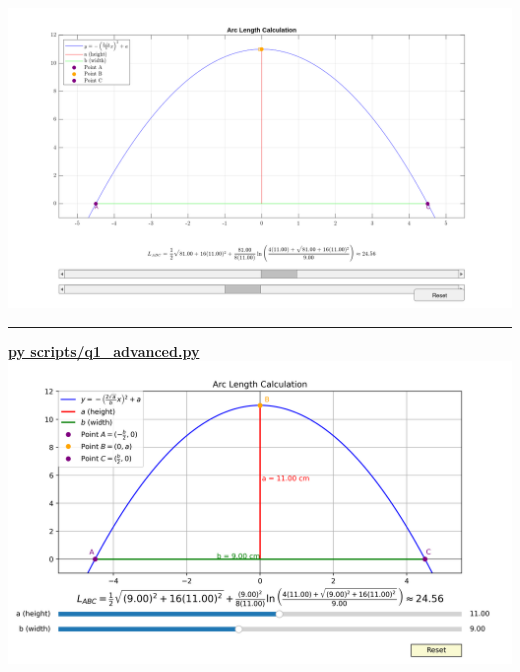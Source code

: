 \documentclass[a4paper, 12pt]{report}
\def\link{blue!50!black}
\begin{document}
    
    \includegraphics[width=1\textwidth]{images/rmatFigure_1.png}\\
    \vspace{2em}    
    \hrule
    \vspace{3em}
    \href{https://github.com/sakx7/mathcompuni/blob/main/py scripts/q1_advanced.py}{\textcolor{\link}{\textbf{py scripts/q1\_advanced.py}}}
    \includegraphics[width=1\textwidth]{images/Figure_1.png}\\
\end{document}
